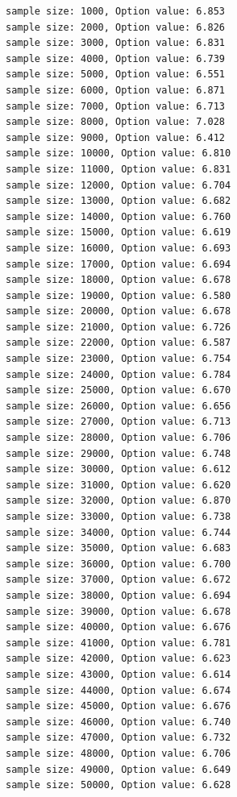 \documentclass[11pt]{article}
\begin{document}
    \begin{Verbatim}[commandchars=\\\{\}]
sample size: 1000, Option value: 6.853
sample size: 2000, Option value: 6.826
sample size: 3000, Option value: 6.831
sample size: 4000, Option value: 6.739
sample size: 5000, Option value: 6.551
sample size: 6000, Option value: 6.871
sample size: 7000, Option value: 6.713
sample size: 8000, Option value: 7.028
sample size: 9000, Option value: 6.412
sample size: 10000, Option value: 6.810
sample size: 11000, Option value: 6.831
sample size: 12000, Option value: 6.704
sample size: 13000, Option value: 6.682
sample size: 14000, Option value: 6.760
sample size: 15000, Option value: 6.619
sample size: 16000, Option value: 6.693
sample size: 17000, Option value: 6.694
sample size: 18000, Option value: 6.678
sample size: 19000, Option value: 6.580
sample size: 20000, Option value: 6.678
sample size: 21000, Option value: 6.726
sample size: 22000, Option value: 6.587
sample size: 23000, Option value: 6.754
sample size: 24000, Option value: 6.784
sample size: 25000, Option value: 6.670
sample size: 26000, Option value: 6.656
sample size: 27000, Option value: 6.713
sample size: 28000, Option value: 6.706
sample size: 29000, Option value: 6.748
sample size: 30000, Option value: 6.612
sample size: 31000, Option value: 6.620
sample size: 32000, Option value: 6.870
sample size: 33000, Option value: 6.738
sample size: 34000, Option value: 6.744
sample size: 35000, Option value: 6.683
sample size: 36000, Option value: 6.700
sample size: 37000, Option value: 6.672
sample size: 38000, Option value: 6.694
sample size: 39000, Option value: 6.678
sample size: 40000, Option value: 6.676
sample size: 41000, Option value: 6.781
sample size: 42000, Option value: 6.623
sample size: 43000, Option value: 6.614
sample size: 44000, Option value: 6.674
sample size: 45000, Option value: 6.676
sample size: 46000, Option value: 6.740
sample size: 47000, Option value: 6.732
sample size: 48000, Option value: 6.706
sample size: 49000, Option value: 6.649
sample size: 50000, Option value: 6.628
    \end{Verbatim}
\end{document}
